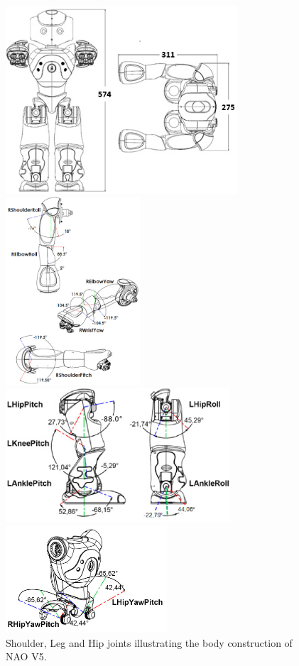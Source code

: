 \begin{figure}
	\begin{minipage}
		{.6 
		\textwidth} 
		\includegraphics[height=7cm]{figures/content/nao-body.jpg} 
	\end{minipage}
	\begin{minipage}
		{.4 
		\textwidth} \hspace{10 mm} 
		\includegraphics[height=7cm]{figures/content/nao-hand.jpg} 
	\end{minipage}
	\begin{minipage}
		{.6 
		\textwidth} \vspace{10 mm} 
		\includegraphics[height=50mm]{figures/content/nao-leg.jpg} 
	\end{minipage}
	\begin{minipage}
		{.4 
		\textwidth} \hspace{10 mm} 
		\includegraphics[height=40mm]{figures/content/nao-hip.jpg} 
	\end{minipage}
	\caption{Shoulder, Leg and Hip joints illustrating the body construction of NAO V5. \cite{8}} \label{fg:nao:body} 
\end{figure}

